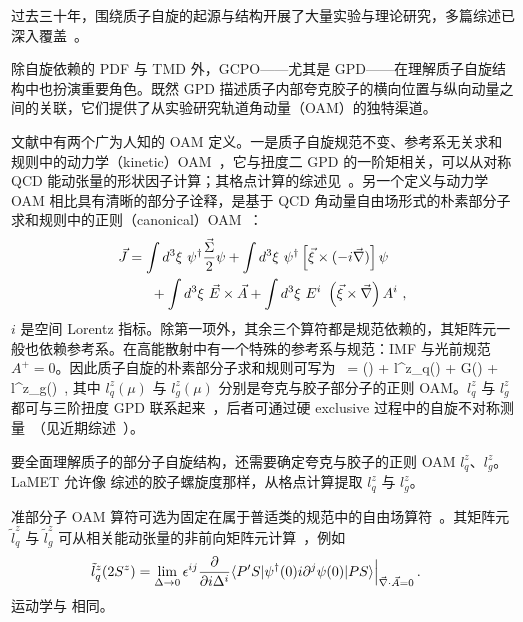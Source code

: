 过去三十年，围绕质子自旋的起源与结构开展了大量实验与理论研究，多篇综述已深入覆盖~\cite{Filippone:2001ux,Bass:2004xa,Aidala:2012mv,Leader:2013jra,Ji:2016djn,Deur:2018roz,Ji:2020ena}。

除自旋依赖的 PDF 与 TMD 外，GCPO——尤其是 GPD——在理解质子自旋结构中也扮演重要角色。既然 GPD 描述质子内部夸克胶子的横向位置与纵向动量之间的关联，它们提供了从实验研究轨道角动量（OAM）的独特渠道。

文献中有两个广为人知的 OAM 定义。一是质子自旋规范不变、参考系无关求和规则中的动力学（kinetic）OAM~\cite{Ji:1996ek,Ji:1996nm}，它与扭度二 GPD 的一阶矩相关，可以从对称 QCD 能动张量的形状因子计算；其格点计算的综述见~\cite{Ji:2020ena}。另一个定义与动力学 OAM 相比具有清晰的部分子诠释，是基于 QCD 角动量自由场形式的朴素部分子求和规则中的正则（canonical）OAM~\cite{Jaffe:1989jz}：
\begin{align}\label{eq:jmam}
	\vec{J} &= \int d^3\xi\ \psi^\dagger \frac{\vec{\Sigma}}{2} \psi + \int d^3\xi\ \psi^\dagger\left[\vec{\xi}\times (-i\vec{\nabla} )\right]\psi \nn\\
	&\ \ \ \ \ + \int d^3\xi\ \vec{E}\times\vec{A} + \int d^3\xi\ E^i\ \left(\vec{\xi}\times\vec{\nabla}\right) A^{i} \ ,
\end{align}
$i$ 是空间 Lorentz 指标。除第一项外，其余三个算符都是规范依赖的，其矩阵元一般也依赖参考系。在高能散射中有一个特殊的参考系与规范：IMF 与光前规范 $A^+=0$。因此质子自旋的朴素部分子求和规则可写为~\cite{Jaffe:1989jz}
\beq\label{eq:jm}
= \Delta \Sigma(\mu)  + l^z_q(\mu) + \Delta G(\mu) + l^z_g(\mu) \,,
\eeq
其中 $l^z_q(\mu)$ 与 $l^z_g(\mu)$ 分别是夸克与胶子部分子的正则 OAM。$l_q^z$ 与 $l_g^z$ 都可与三阶扭度 GPD 联系起来~\cite{Hatta:2011ku,Ji:2012ba,Hatta:2012cs}，后者可通过硬 exclusive 过程中的自旋不对称测量~\cite{Ji:2016jgn,Hatta:2016aoc,Bhattacharya:2017bvs,Bhattacharya:2018lgm}（见近期综述~\cite{Ji:2020ena}）。

要全面理解质子的部分子自旋结构，还需要确定夸克与胶子的正则 OAM $l^z_q$、$l^z_g$。LaMET 允许像  综述的胶子螺旋度那样，从格点计算提取 $l_q^z$ 与 $l_g^z$。

准部分子 OAM 算符可选为固定在属于普适类的规范中的自由场算符~\cite{Hatta:2013gta}。其矩阵元 $\tilde l^z_q$ 与 $\tilde l^z_g$ 可从相关能动张量的非前向矩阵元计算~\cite{Zhao:2015kca}，例如
\begin{align}
	\tilde l^z_q(2S^z) &= \lim_{\Delta\to0} \epsilon^{ij}{\partial \over \partial i\Delta^i}\langle P'S| \psi^\dagger (0) i\partial^j \psi(0)|PS\rangle \Big|_{\vec{\nabla}\cdot \vec{A}=0}\,.
\end{align}
运动学与  相同。

